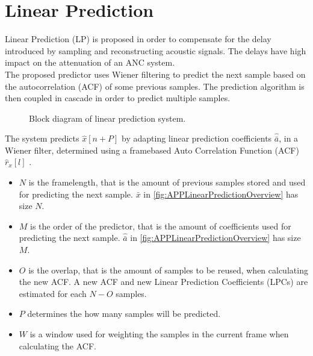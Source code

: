 \section{Linear Prediction}
Linear Prediction (LP) is proposed in order to compensate for the delay introduced by sampling and reconstructing acoustic signals. The delays have high impact on the attenuation of an ANC system. \\
The proposed predictor uses Wiener filtering to predict the next sample based on the autocorrelation (ACF) of some previous samples. The prediction algorithm is then coupled in cascade in order to predict multiple samples. 

\begin{figure}[H]
	\centering
	
	\caption{Block diagram of linear prediction system.}
	\label{fig:APPLinearPredictionOverview}
\end{figure}
The system predicts $\hat{x}[n+P]$ by adapting linear prediction coefficients $\hat{\bar{a}}$, in a Wiener filter, determined using a framebased Auto Correlation Function (ACF) $\hat{r}_x[l]$ \cite{LinearPrediction}.

\begin{itemize} 
	\item $N$ is the framelength, that is the amount of previous samples stored and used for predicting the next sample. $\bar{x}$ in \autoref{fig:APPLinearPredictionOverview} has size $N$.
	\item $M$ is the order of the predictor, that is the amount of coefficients used for predicting the next sample. $\hat{\bar{a}}$ in \autoref{fig:APPLinearPredictionOverview} has size $M$.
	\item $O$ is the overlap, that is the amount of samples to be reused, when calculating the new ACF. A new ACF and new Linear Prediction Coefficients (LPCs) are estimated for each $N-O$ samples.
	\item $P$ determines the how many samples will be predicted. 
	\item $W$ is a window used for weighting the samples in the current frame when calculating the ACF. 
\end{itemize}


